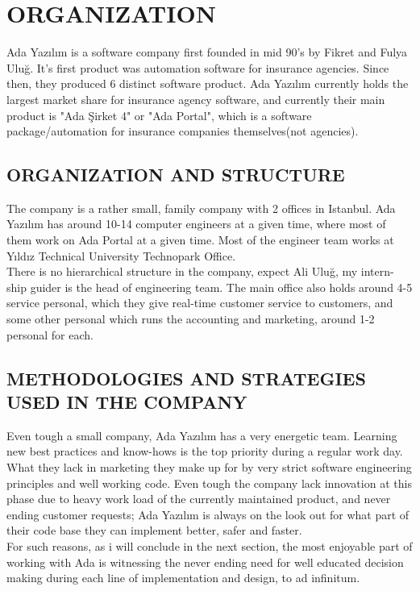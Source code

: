 \documentclass[titlepage, a4paper, 14pt]{extarticle} %
\begin{document}
\section{ORGANIZATION} \label{organization}

Ada Yazılım is a software company first founded in mid 90's by Fikret and Fulya Uluğ. It's first product was automation software for insurance agencies. Since then, they produced 6 distinct software product. Ada Yazılım currently holds the largest market share for insurance agency software, and currently their main product is "Ada Şirket 4" or "Ada Portal", which is a software package/automation for insurance companies themselves(not agencies).

\subsection{ORGANIZATION AND STRUCTURE} \label{structure}

The company is a rather small, family company with 2 offices in Istanbul. Ada Yazılım has around 10-14 computer engineers at a given time, where most of them work on Ada Portal at a given time. Most of the engineer team works at Yıldız Technical University Technopark Office.\\

 There is no hierarchical structure in the company, expect Ali Uluğ, my intern-ship guider is the head of engineering team. The main office also holds around 4-5 service personal, which they give real-time customer service to customers, and some other personal which runs the accounting and marketing, around 1-2 personal for each. 




\subsection{METHODOLOGIES AND STRATEGIES USED IN THE COMPANY} \label{strategies}

Even tough a small company, Ada Yazılım has a very energetic team. Learning new best practices and know-hows is the top priority during a regular work day. What they lack in marketing they make up for by very strict software engineering principles and well working code. Even tough the company lack innovation at this phase due to heavy work load of the currently maintained product, and never ending customer requests; Ada Yazılım is always on the look out for what part of their code base they can implement better, safer and faster. \\ For such reasons, as i will conclude in the next section, the most enjoyable part of working with Ada is witnessing the never ending need for well educated decision making during each line of implementation and design, to ad infinitum.
\end{document}
